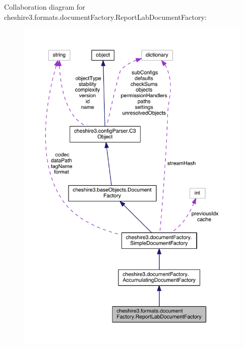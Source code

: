 Collaboration diagram for cheshire3.\-formats.\-document\-Factory.\-Report\-Lab\-Document\-Factory\-:
\nopagebreak
\begin{figure}[H]
\begin{center}
\leavevmode
\includegraphics[width=350pt]{classcheshire3_1_1formats_1_1document_factory_1_1_report_lab_document_factory__coll__graph}
\end{center}
\end{figure}
